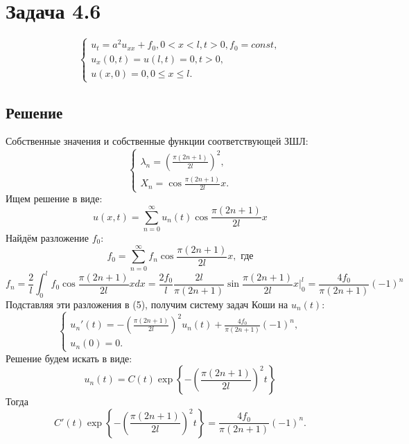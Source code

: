 \documentclass[11pt]{article}
\begin{document}
\section{Задача 4.6}
\label{sec:org8cf17c0}
\begin{equation}
\begin{cases}
u_t = a^2u_{xx} + f_0, 0 < x < l, t > 0, f_0 = const, \\
u_x(0, t) = u(l, t) = 0, t > 0, \\
u(x, 0) = 0, 0 \leq x \leq l.
\end{cases}
\end{equation}
\subsection{Решение}
\label{sec:org7290ac4}
Собственные значения и собственные функции соответствующей ЗШЛ:
\begin{equation*}
\begin{cases}
\lambda_n = \left(\frac{\pi(2n + 1)}{2l}\right)^2, \\
X_n = \cos\frac{\pi(2n + 1)}{2l}x.
\end{cases}
\end{equation*}
Ищем решение в виде:
\begin{equation*}
u(x, t) = \sum_{n = 0}^{\infty}u_n(t)\cos\frac{\pi(2n + 1)}{2l}x
\end{equation*}
Найдём разложение $f_0$:
\begin{equation*}
f_0 = \sum_{n = 0}^{\infty}f_n\cos\frac{\pi(2n + 1)}{2l}x, \text{ где}
\end{equation*}
\begin{equation*}
f_n = \frac2l\int_0^lf_0\cos\frac{\pi(2n + 1)}{2l}xdx =
\frac{2f_0}{l}\frac{2l}{\pi(2n + 1)}\sin\frac{\pi(2n + 1)}{2l}x\bigg|_0^l =
\frac{4f_0}{\pi(2n + 1)}(-1)^n
\end{equation*}
Подставляя эти разложения в (5), получим систему задач Коши на $u_n(t)$:
\begin{equation}
\begin{cases}
u_n'(t) = -\left(\frac{\pi(2n + 1)}{2l}\right)^2u_n(t) + \frac{4f_0}{\pi(2n + 1)}(-1)^n, \\
u_n(0) = 0.
\end{cases}
\end{equation}
Решение будем искать в виде:
\begin{equation*}
u_n(t) = C(t)\exp\left\{-\left(\frac{\pi(2n + 1)}{2l}\right)^2t\right\}
\end{equation*}
Тогда
\begin{equation*}
C'(t)\exp\left\{-\left(\frac{\pi(2n + 1)}{2l}\right)^2t\right\} = \frac{4f_0}{\pi(2n + 1)}(-1)^n.
\end{equation*}
\end{document}
